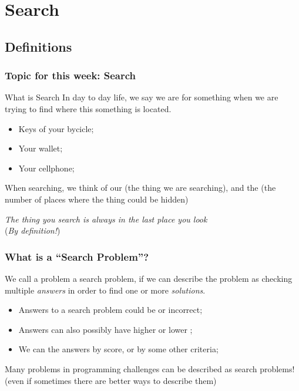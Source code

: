 \documentclass{beamer}
\begin{document}
\section{Search}

\subsection{Definitions}
\begin{frame}
  \frametitle{Topic for this week: Search}

  \begin{block}{What is Search}
    In day to day life, we say we are  for
    something when we are trying to find where this something is
    located.

    \begin{itemize}
    \item Keys of your bycicle;
    \item Your wallet;
    \item Your cellphone;
    \end{itemize}

    When searching, we think of our  (the thing we are
    searching), and the  (the number of places
    where the thing could be hidden)
    
  \end{block}
  
  {\smaller
  \hfill \emph{The thing you search is always in the last place you look}\\
  \hfill (\emph{By definition!})}
\end{frame}

\begin{frame}
  \frametitle{What is a ``Search Problem''?}
  {\small
    
    We call a problem a search problem, if we can describe the problem
    as checking multiple \emph{answers} in order to find one or more
    \emph{solutions}.

    \medskip

    \begin{itemize}
    \item Answers to a search problem could be  or \alert{incorrect};
    \item Answers can also possibly have higher or lower ;
    \item We can  the answers by score, or by some other criteria;
    \end{itemize}

    \bigskip

    Many problems in programming challenges can be described as search
    problems! (even if sometimes there are better ways to describe
    them)
  }
\end{frame}
\end{document}
